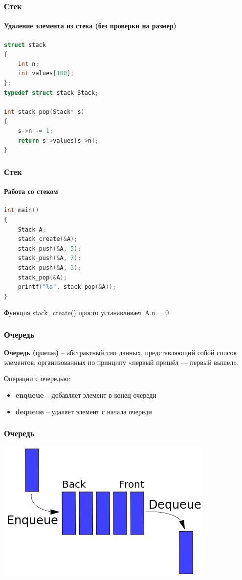 \documentclass[12pt,pdf,hyperref={unicode}]{beamer}
\begin{document}
\begin{frame}[fragile]
\frametitle{Стек} 
\framesubtitle{Удаление элемента из стека (без проверки на размер)} 
\begin{lstlisting}[language=C++,basicstyle=\ttfamily,keywordstyle=\color{blue}]
struct stack 
{
    int n;
    int values[100];
};
typedef struct stack Stack;

int stack_pop(Stack* s)
{
    s->n -= 1;
    return s->values[s->n];
}
\end{lstlisting}
\end{frame}

\begin{frame}[fragile]
\frametitle{Стек} 
\framesubtitle{Работа со стеком} 
\begin{lstlisting}[language=C++,basicstyle=\ttfamily,keywordstyle=\color{blue}]
int main()
{
    Stack A;
    stack_create(&A);
    stack_push(&A, 5);
    stack_push(&A, 7);
    stack_push(&A, 3);
    stack_pop(&A);
    printf("%d", stack_pop(&A));
}
\end{lstlisting}
Функция stack\_create() просто устанавливает A.n = 0
\end{frame}

\begin{frame}[fragile]
\frametitle{Очередь} 
\textbf{Очередь (queue)} -- абстрактный тип данных, представляющий собой список элементов, организованных по принципу «первый пришёл — первый вышел». 

Операции с очередью:
\begin{itemize}
\item \textbf{enqueue} -- добавляет элемент в конец очереди
\item \textbf{dequeue} -- удаляет элемент с начала очереди
\end{itemize}
\end{frame}

\begin{frame}[fragile]
\frametitle{Очередь} 
\begin{center}
\includegraphics[width=0.8\linewidth]{images/queue_image.png}
\end{center}
\end{frame}
\end{document}
